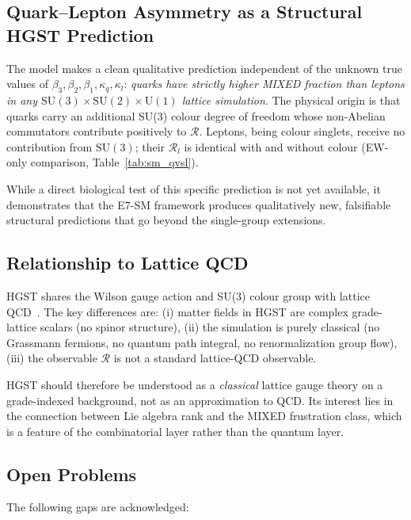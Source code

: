 \documentclass[12pt,a4paper]{article}
\newcommand{\R}{\mathcal{R}}           %
\newcommand{\SU}[1]{\mathrm{SU}(#1)}
\newcommand{\UN}[1]{\mathrm{U}(#1)}
\newcommand{\SM}{\SU{3}\!\times\!\SU{2}\!\times\!\UN{1}}
\theoremstyle{plain}
\theoremstyle{definition}
\theoremstyle{remark}
\begin{document}
\subsection{Quark--Lepton Asymmetry as a Structural HGST Prediction}

The model makes a clean qualitative prediction independent of the unknown true values
of $\beta_3,\beta_2,\beta_1,\kappa_q,\kappa_l$: \emph{quarks have strictly higher
MIXED fraction than leptons in any $\SM$ lattice simulation}.
The physical origin is that quarks carry an additional SU(3) colour degree of freedom
whose non-Abelian commutators contribute positively to $\R$.
Leptons, being colour singlets, receive no contribution from $\SU{3}$; their $\R_l$
is identical with and without colour (EW-only comparison, Table~\ref{tab:sm_qvsl}).

While a direct biological test of this specific prediction is not yet available,
it demonstrates that the E7-SM framework produces qualitatively new, falsifiable
structural predictions that go beyond the single-group extensions.

\subsection{Relationship to Lattice QCD}

HGST shares the Wilson gauge action and SU(3) colour group with lattice
QCD~\citep{Wilson1974,Montvay1994}.
The key differences are:
(i) matter fields in HGST are complex grade-lattice scalars (no spinor structure),
(ii) the simulation is purely classical (no Grassmann fermions, no quantum path
integral, no renormalization group flow),
(iii) the observable $\R$ is not a standard lattice-QCD observable.

HGST should therefore be understood as a \emph{classical} lattice gauge theory on a
grade-indexed background, not as an approximation to QCD.
Its interest lies in the connection between Lie algebra rank and the MIXED
frustration class, which is a feature of the combinatorial layer rather than the
quantum layer.

\subsection{Open Problems}

The following gaps are acknowledged:
\end{document}
